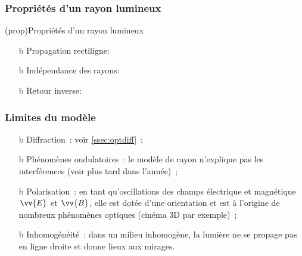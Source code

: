 \documentclass[../../main/main.tex]{subfiles}
\begin{document}
\subsubsection{Propriétés d'un rayon lumineux}

\begin{tcb*}[label=prop:rl](prop){Propriétés d'un rayon lumineux}
	\begin{enumerate}
		\item[b]{Propagation rectiligne}: %
		\item[b]{Indépendance des rayons}: %
		\item[b]{Retour inverse}: %
		\begin{center}
			\captionsetup{justification=centering}
		\end{center}
	\end{enumerate}
\end{tcb*}

\subsubsection{Limites du modèle}

\begin{itemize}[label=$\diamond$, leftmargin=10pt]
	\item[b]{Diffraction}~: voir \ref{ssec:optdiff}~;
	\item[b]{Phénomènes ondulatoires}~: le modèle de rayon n'explique pas les
	interférences (voir plus tard dans l'année)~;
	\item[b]{Polarisation}~: en tant qu'oscillations des champs électrique et
	magnétique $\vv{E}$ et $\vv{B}$, elle est dotée d'une orientation et est à
	l'origine de nombreux phénomènes optiques (cinéma 3D par exemple)~;
	\item[b]{Inhomogénéité}~: dans un milieu inhomogène, la lumière ne se propage
	pas en ligne droite et donne lieux aux mirages.
\end{itemize}
\end{document}
